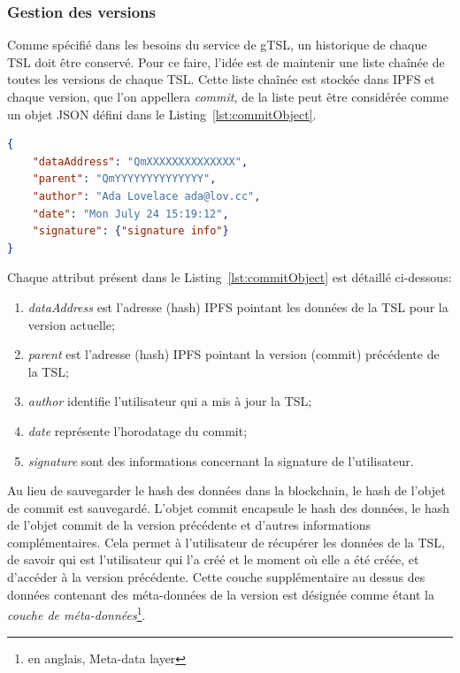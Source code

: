 \documentclass{tnreport}
\begin{document}
\subsubsection{Gestion des versions}

Comme spécifié dans les besoins du service de gTSL, un historique de chaque TSL doit être conservé. 
Pour ce faire, l'idée est de maintenir une liste chaînée de toutes les versions de chaque TSL.
Cette liste chaînée est stockée dans IPFS et chaque version, que l'on appellera {\em commit}, de la liste peut être considérée comme un objet JSON défini dans le Listing~\ref{lst:commitObject}.

\begin{lstlisting}[language=json, basicstyle=\small, caption={Commit Object}, label={lst:commitObject}]
{
	"dataAddress": "QmXXXXXXXXXXXXXX",
	"parent": "QmYYYYYYYYYYYYYY",
	"author": "Ada Lovelace ada@lov.cc",
	"date": "Mon July 24 15:19:12",
	"signature": {"signature info"}
}
\end{lstlisting}

Chaque attribut présent dans le Listing~\ref{lst:commitObject} est détaillé ci-dessous:
\begin{enumerate}
	\item \textit{dataAddress} est l'adresse (hash) IPFS pointant les données de la TSL pour la version actuelle;
	\item \textit{parent} est l'adresse (hash) IPFS pointant la version (commit) précédente de la TSL;
	\item \textit{author} identifie l'utilisateur qui a mis à jour la TSL;
	\item \textit{date} représente l'horodatage du commit;
	\item \textit{signature} sont des informations concernant la signature de l'utilisateur.
\end{enumerate}

Au lieu de sauvegarder le hash des données dans la blockchain, le hash de l'objet de commit est sauvegardé. L'objet commit encapsule le hash des données, le hash de l'objet commit de la version précédente et d'autres informations complémentaires. 
Cela permet à l'utilisateur de récupérer les données de la TSL, de savoir qui est l'utilisateur qui l'a créé et le moment où elle a été créée, et d'accéder à la version précédente. 
Cette couche supplémentaire au dessus des données contenant des méta-données de la version est désignée comme étant la {\em couche de méta-données}\footnote{en anglais, Meta-data layer}.
\end{document}
